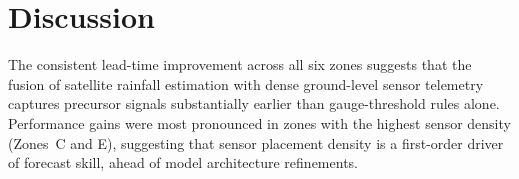 \section{Discussion}
The consistent lead-time improvement across all six zones suggests that the fusion of satellite rainfall estimation with dense ground-level sensor telemetry captures precursor signals substantially earlier than gauge-threshold rules alone. Performance gains were most pronounced in zones with the highest sensor density (Zones~C and E), suggesting that sensor placement density is a first-order driver of forecast skill, ahead of model architecture refinements.

